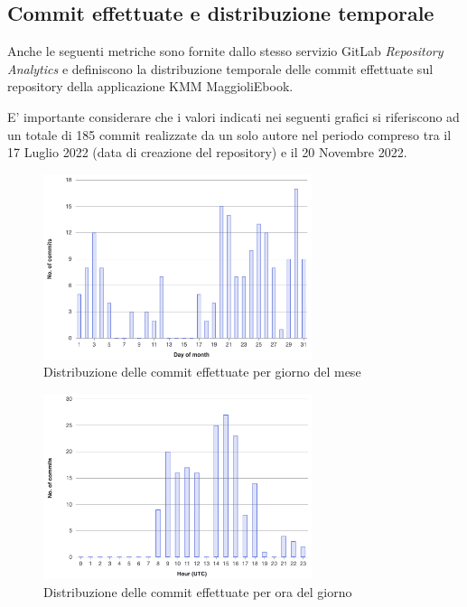 \subsection*{Commit effettuate e distribuzione temporale}
Anche le seguenti metriche sono fornite dallo stesso servizio GitLab \textit{Repository Analytics} e definiscono la distribuzione temporale delle commit effettuate sul repository della applicazione KMM MaggioliEbook.

E' importante considerare che i valori indicati nei seguenti grafici si riferiscono ad un totale di 185 commit realizzate da un solo autore nel periodo compreso tra il 17 Luglio 2022 (data di creazione del repository) e il 20 Novembre 2022.

\begin{figure}[H]
\centering
    \includegraphics[width=0.7\textwidth]{img/commit-per-day-of-month.png}
    \caption{Distribuzione delle commit effettuate per giorno del mese}
    \label{commit-per-day-of-month}
\end{figure}

\begin{figure}[H]
\centering
    \includegraphics[width=0.7\textwidth]{img/commit-per-day-hour.png}
    \caption{Distribuzione delle commit effettuate per ora del giorno}
    \label{commit-per-day-hour}
\end{figure}

